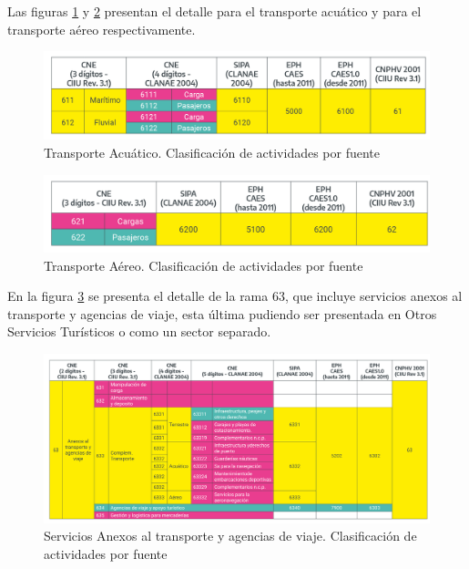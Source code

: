 \documentclass[
  openany]{book}
\begin{document}
Las figuras \ref{fig:empleofuentes7} y \ref{fig:empleofuentes8} presentan el detalle para el transporte acuático y para el transporte aéreo respectivamente.

\begin{figure}

{\centering \includegraphics[width=1\linewidth]{imagenes/figura3.7} 

}

\caption{Transporte Acuático. Clasificación de actividades por fuente}\label{fig:empleofuentes7}
\end{figure}

\begin{figure}

{\centering \includegraphics[width=1\linewidth]{imagenes/figura3.8} 

}

\caption{Transporte Aéreo. Clasificación de actividades por fuente}\label{fig:empleofuentes8}
\end{figure}

En la figura \ref{fig:empleofuentes9} se presenta el detalle de la rama 63, que incluye servicios anexos al transporte y agencias de viaje, esta última pudiendo ser presentada en Otros Servicios Turísticos o como un sector separado.

\begin{figure}

{\centering \includegraphics[width=1\linewidth]{imagenes/figura3.9} 

}

\caption{Servicios Anexos al transporte y agencias de viaje. Clasificación de actividades por fuente}\label{fig:empleofuentes9}
\end{figure}
\end{document}
